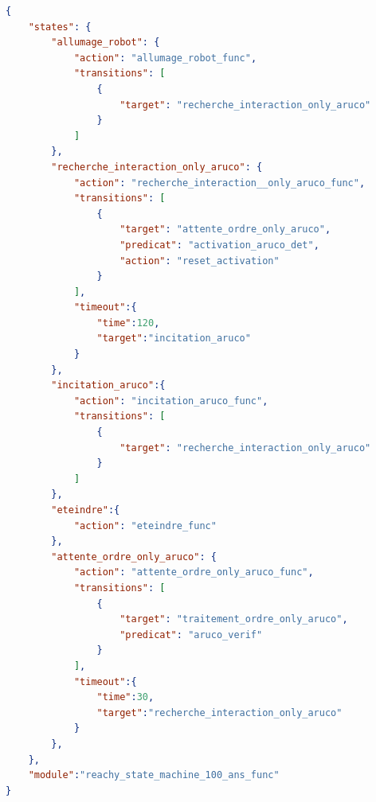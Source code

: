 \documentclass[a4paper,french]{article}
\begin{document}
\begin{lstlisting}[language=json,firstnumber=1,caption={Machine à états factice afin de comprendre la structure des \texttt{.json}},captionpos=b]
    {
    "states": {
        "allumage_robot": {
            "action": "allumage_robot_func",
            "transitions": [
                {   
                    "target": "recherche_interaction_only_aruco"
                }
            ]
        },
        "recherche_interaction_only_aruco": {
            "action": "recherche_interaction__only_aruco_func",
            "transitions": [
                {
                    "target": "attente_ordre_only_aruco",
                    "predicat": "activation_aruco_det",
                    "action": "reset_activation"
                }
            ],
            "timeout":{
                "time":120,
                "target":"incitation_aruco"
            }
        },
        "incitation_aruco":{
            "action": "incitation_aruco_func",
            "transitions": [
                {
                    "target": "recherche_interaction_only_aruco"
                }
            ] 
        },
        "eteindre":{
            "action": "eteindre_func"
        },
        "attente_ordre_only_aruco": {
            "action": "attente_ordre_only_aruco_func",
            "transitions": [
                {
                    "target": "traitement_ordre_only_aruco",
                    "predicat": "aruco_verif"
                }
            ],
            "timeout":{
                "time":30,
                "target":"recherche_interaction_only_aruco"
            }
        },
    },
    "module":"reachy_state_machine_100_ans_func"
}

\end{lstlisting}
\end{document}
